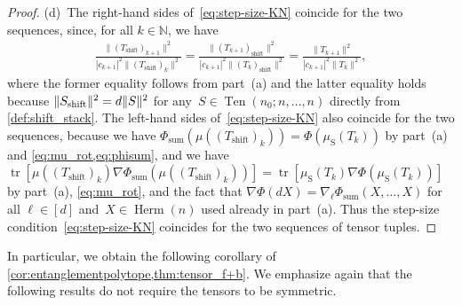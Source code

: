 \documentclass[11pt,letterpaper]{article}
\numberwithin{equation}{section}
\newcommand{\NN}{\mathbb{N}}
\DeclareMathOperator{\Sym}{S}
\DeclareMathOperator{\tr}{tr}
\DeclareMathOperator{\Herm}{Herm}
\DeclareMathOperator{\Ten}{Ten}
\DeclareMathOperator{\Shf}{shift}
\DeclareMathOperator{\Sum}{sum}
\DeclarePairedDelimiter\norm{\lVert}{\rVert}
\begin{document}
\begin{proof}
(d)~The right-hand sides of~\eqref{eq:step-size-KN} coincide for the two sequences, since, for all $k \in \NN$, we have
\begin{align*}
\frac{\|(T_{\Shf})_{k+1}\|^2}{|c_{k+1}|^2\|(T_{\Shf})_k\|^2}
=  \frac{\|(T_{k+1})_{\Shf}\|^2}{|c_{k+1}|^2\|(T_k)_{\Shf}\|^2}
=  \frac{\|T_{k+1}\|^2}{|c_{k+1}|^2\|T_k\|^2},
\end{align*}
where the former equality follows from part~(a) and the latter equality holds because $\norm{S_{\Shf}}^2 = d\norm{S}^2$ for any~$S \in \Ten(n_0; n, \ldots, n)$ directly from \cref{def:shift_stack}.
The left-hand sides of~\eqref{eq:step-size-KN} also coincide for the two sequences, because we have $\Phi_{\Sum}(\mu((T_{\Shf})_k)) = \Phi(\mu_{\Sym}(T_k))$ by part~(a) and \cref{eq:mu_rot,eq:phisum}, and we have $\tr[\mu((T_{\Shf})_k)\nabla\Phi_{\Sum}(\mu((T_{\Shf})_k))] = \tr[\mu_{\Sym}(T_k)\nabla\Phi(\mu_{\Sym}(T_k))]$ by part~(a), \cref{eq:mu_rot}, and the fact that $\nabla\Phi(d X) = \nabla_\ell\Phi_{\Sum}(X, \ldots, X)$ for all $\ell \in [d]$ and~$X\in\Herm(n)$ used already in part~(a).
Thus the step-size condition~\eqref{eq:step-size-KN} coincides for the two sequences of tensor tuples.
\end{proof}

In particular, we obtain the following corollary of \cref{cor:entanglementpolytope,thm:tensor_f+b}.
We emphasize again that the following results do not require the tensors to be symmetric.
\end{document}

